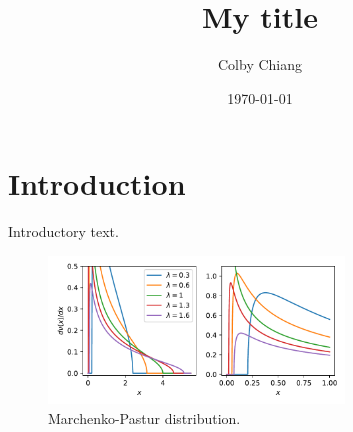 \documentclass[a4paper,10pt]{article}
\title{My title}
\author{Colby Chiang}
\date{\today}
\begin{document}
\maketitle

\section*{Introduction}
Introductory text.

\begin{figure}[ht]
    \centering
    \includegraphics[width=0.7\textwidth]{Marchenko-Pastur_distribution.pdf}
    \caption{Marchenko-Pastur distribution.}
    \label{fig:mp-dist} %
  \end{figure}

\citep{Dahl2020-vw}

\printbibliography
\end{document}
